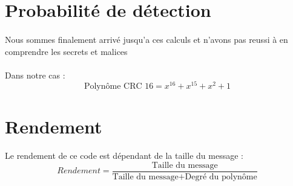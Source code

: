     \section{Probabilité de détection}

        \paragraph{}
Nous sommes finalement arrivé jusqu'a ces calculs et n'avons pas reussi à en comprendre les secrets et malices
        \paragraph{}
Dans notre cas :
\[  \text{Polynôme CRC 16} = x^{16} + x^{15} + x^{2}+ 1 \]


    \section{Rendement}

        \paragraph{}
Le rendement de ce code est dépendant de la taille du message :
\[  Rendement = \frac{\text{Taille du message}}{\text{Taille du message} + \text{Degré du polynôme}} \]

